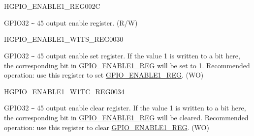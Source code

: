 \begin{register}{H}{GPIO\_ENABLE1\_REG}{\hexprefix{}002C}\label{regdesc:GPIOENABLE1REG}
%
%
\regnewline%
\begin{regdesc}\begin{reglist}
\label{fielddesc:GPIOENABLE1DATA}\item [GPIO\_ENABLE1\_DATA] GPIO32 \verb+~+ 45 output enable register. (R/W)
\end{reglist}\end{regdesc}
\end{register}


\begin{register}{H}{GPIO\_ENABLE1\_W1TS\_REG}{\hexprefix{}0030}\label{regdesc:GPIOENABLE1W1TSREG}
%
%
\regnewline%
\begin{regdesc}\begin{reglist}
\label{fielddesc:GPIOENABLE1W1TS}\item [GPIO\_ENABLE1\_W1TS] GPIO32 \verb+~+ 45 output enable set register. If the value 1 is written to a bit here, the corresponding bit in \hyperref[regdesc:GPIOENABLE1REG]{GPIO\_ENABLE1\_REG} will be set to 1. Recommended operation: use this register to set \hyperref[regdesc:GPIOENABLE1REG]{GPIO\_ENABLE1\_REG}. (WO)
\end{reglist}\end{regdesc}
\end{register}


\begin{register}{H}{GPIO\_ENABLE1\_W1TC\_REG}{\hexprefix{}0034}\label{regdesc:GPIOENABLE1W1TCREG}
%
%
\regnewline%
\begin{regdesc}\begin{reglist}
\label{fielddesc:GPIOENABLE1W1TC}\item [GPIO\_ENABLE1\_W1TC] GPIO32 \verb+~+ 45 output enable clear register. If the value 1 is written to a bit here, the corresponding bit in \hyperref[regdesc:GPIOENABLE1REG]{GPIO\_ENABLE1\_REG} will be cleared. Recommended operation: use this register to clear \hyperref[regdesc:GPIOENABLE1REG]{GPIO\_ENABLE1\_REG}. (WO)
\end{reglist}\end{regdesc}
\end{register}


